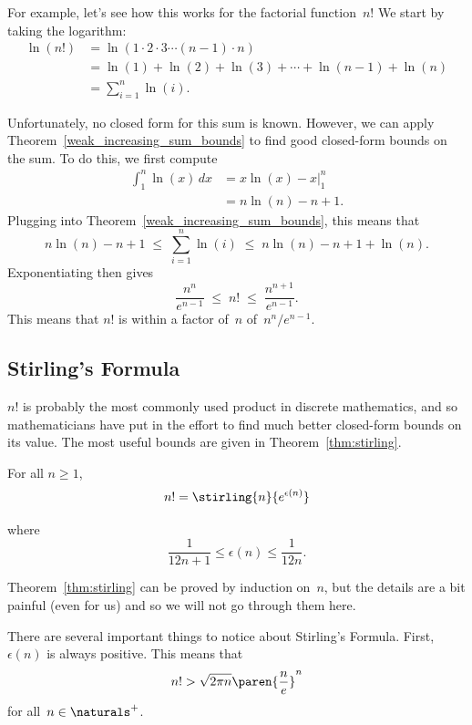 For example, let's see how this works for the factorial
function~$n!$  We start by taking the logarithm:
\begin{align*}
\ln (n!)
       & =  \ln(1 \cdot 2 \cdot 3 \cdots (n-1) \cdot n) \\
       & =  \ln(1) + \ln(2) + \ln(3) + \cdots + \ln(n-1) + \ln(n) \\
       & =  \sum_{i=1}^n \ln(i).
\end{align*}

Unfortunately, no closed form for this sum is known.  However, we can
apply Theorem~\ref{weak_increasing_sum_bounds} to find good closed-form bounds on the
sum.  To do this, we first compute
\begin{align*}
\int_1^n \ln(x) \, dx
    &= x \ln(x) - x \Bigr|_1^n \\
    &= n \ln(n) - n + 1.
\end{align*}
Plugging into Theorem~\ref{weak_increasing_sum_bounds}, this means that
\[
    n \ln(n) - n + 1
    \;\le\; \sum_{i = 1}^n \ln(i)
    \;\le\; n \ln(n) - n + 1 + \ln(n).
\]
Exponentiating then gives
\begin{equation}\label{eqn:9Q1}
    \frac{n^n}{e^{n - 1}} \;\le\; n! \;\le\; \frac{n^{n + 1}}{e^{n - 1}}.
\end{equation}
This means that $n!$ is within a factor of~$n$ of~$n^n/e^{n - 1}$.

\subsection{Stirling's Formula}

$n!$ is probably the most commonly used product in discrete
mathematics, and so mathematicians have put in the effort to find much
better closed-form bounds on its value.  The most useful bounds are
given in Theorem~\ref{thm:stirling}.


\begin{theorem}\label{thm:stirling}
For all $n \ge 1$,
\[
    n! = \stirling{n}{e^{\epsilon(n)}}
\]

where
\[
    \frac{1}{12 n + 1} \le \epsilon(n) \le \frac{1}{12n}.
\]
\end{theorem}

Theorem~\ref{thm:stirling} can be proved by induction on~$n$, but the
details are a bit painful (even for us) and so we will not go through
them here.

There are several important things to notice about Stirling's
Formula.  First, $\epsilon(n)$ is always positive.  This means that
\begin{equation}\label{eqn:9ZA}
    n! > \sqrt{2\pi n} \paren{\frac{n}{e}}^n
\end{equation}
for all~$n \in \naturals^+$.

